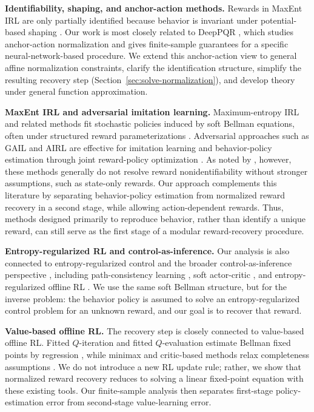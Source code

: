 \documentclass{article}
\newcommand{\1}{\mathbbm{1}}
\begin{document}
\textbf{Identifiability, shaping, and anchor-action methods.}
Rewards in MaxEnt IRL are only partially identified because behavior is
invariant under potential-based shaping
\citep{ng1999policy,fu2018airl,cao2021identifiability,skalse2023invariance,skalse2024partial}.
Our work is most closely related to DeepPQR \citep{geng2020deep}, which studies
anchor-action normalization and gives finite-sample guarantees for a specific
neural-network-based procedure. We extend this anchor-action view to general
affine normalization constraints, clarify the identification structure, simplify
the resulting recovery step (Section~\ref{sec:solve-normalization}), and develop
theory under general function approximation.

\textbf{MaxEnt IRL and adversarial imitation learning.}
Maximum-entropy IRL and related methods fit stochastic policies induced by soft
Bellman equations, often under structured reward parameterizations
\citep{ziebart2008maximum,ziebart2010modeling,levine2011nonlinear,wulfmeier2015deep,zeng2022maximum}.
Adversarial approaches such as GAIL and AIRL are effective for imitation
learning and behavior-policy estimation through joint reward-policy optimization
\citep{ho2016gail,fu2018airl}. As noted by \citet{geng2020deep}, however, these
methods generally do not resolve reward nonidentifiability without stronger
assumptions, such as state-only rewards. Our approach complements this
literature by separating behavior-policy estimation from normalized reward
recovery in a second stage, while allowing action-dependent rewards. Thus,
methods designed primarily to reproduce behavior, rather than identify a unique
reward, can still serve as the first stage of a modular reward-recovery
procedure.

\textbf{Entropy-regularized RL and control-as-inference.}
Our analysis is also connected to entropy-regularized control and the broader
control-as-inference perspective
\citep{kappen2005linear,todorov2009efficient,levine2018rlasinf}, including
path-consistency learning \citep{nachum2017pcl}, soft actor-critic
\citep{haarnoja2018sac}, and entropy-regularized offline RL
\citep{haarnoja2017reinforcement,uehara2023offline}. We use the same soft
Bellman structure, but for the inverse problem: the behavior policy is assumed
to solve an entropy-regularized control problem for an unknown reward, and our
goal is to recover that reward.


\textbf{Value-based offline RL.}
The recovery step is closely connected to value-based offline RL. Fitted
\(Q\)-iteration and fitted \(Q\)-evaluation estimate Bellman fixed points by
regression \citep{ernst2005tree,munos2008finite,mnih2013playing,van2025fitted},
while minimax and critic-based methods relax completeness assumptions
\citep{uehara2020minimax,imaizumi2021minimax,uehara2023offline,xie2020q,xie2021batch, zhan2022offline}. We do not
introduce a new RL update rule; rather, we show that normalized reward recovery
reduces to solving a linear fixed-point equation with these existing tools. Our
finite-sample analysis then separates first-stage policy-estimation error from
second-stage value-learning error.
 
\end{document}
